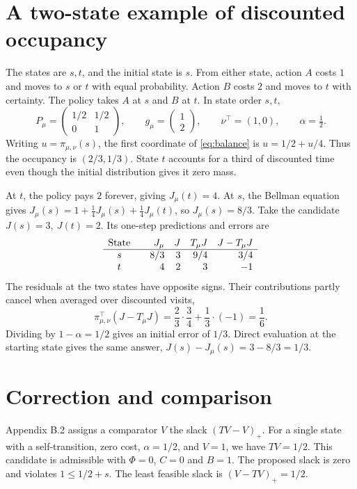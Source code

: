\documentclass[12pt,a4paper]{article}
\begin{document}
\newpage
\section*{A two-state example of discounted occupancy}
The states are \(s,t\), and the initial state is \(s\). From either state,
action \(A\) costs \(1\) and moves to \(s\) or \(t\) with equal probability.
Action \(B\) costs \(2\) and moves to \(t\) with certainty. The policy
takes \(A\) at \(s\) and \(B\) at \(t\). In state order \(s,t\),
\[
 P_\mu=\begin{pmatrix}1/2&1/2\\0&1\end{pmatrix},\qquad
 g_\mu=\begin{pmatrix}1\\2\end{pmatrix},\qquad
 \nu^\top=(1,0),\qquad \alpha=\tfrac12 .
\]
Writing \(u=\pi_{\mu,\nu}(s)\), the first coordinate of
\eqref{eq:balance} is \(u=1/2+u/4\). Thus the occupancy is
\((2/3,1/3)\). State \(t\) accounts for a third of discounted time even
though the initial distribution gives it zero mass.

At \(t\), the policy pays \(2\) forever, giving \(J_\mu(t)=4\). At \(s\),
the Bellman equation gives
\(J_\mu(s)=1+\tfrac14 J_\mu(s)+\tfrac14 J_\mu(t)\), so \(J_\mu(s)=8/3\).
Take the candidate \(J(s)=3,\ J(t)=2\). Its one-step predictions and
errors are
\[
 \begin{array}{c@{\qquad}r@{\quad}r@{\quad}r@{\quad}r}
   \text{State} & J_\mu & J & T_\mu J & J-T_\mu J\\ \hline
   s & 8/3 & 3 & 9/4 & \phantom{-}3/4\\
   t & 4   & 2 & 3   & -1
 \end{array}
\]
The residuals at the two states have opposite signs. Their contributions
partly cancel when averaged over discounted visits,
\[
 \pi_{\mu,\nu}^\top(J-T_\mu J)=\frac23\cdot\frac34+\frac13\cdot(-1)=\frac16 .
\]
Dividing by \(1-\alpha=1/2\) gives an initial error of \(1/3\). Direct
evaluation at the starting state gives the same answer,
\(J(s)-J_\mu(s)=3-8/3=1/3\).

\section*{Correction and comparison}
Appendix B.2 assigns a comparator \(V\) the slack \((TV-V)_+\).
For a single state with a self-transition, zero cost, \(\alpha=1/2\),
and \(V=1\), we have \(TV=1/2\). This candidate is admissible with
\(\Phi=0\), \(C=0\) and \(B=1\). The proposed slack is zero and violates
\(1\le1/2+s\). The least feasible slack is \((V-TV)_+=1/2\).
\end{document}

